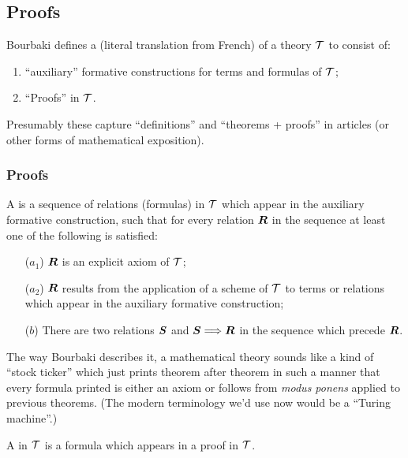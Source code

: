 \subsection{Proofs}

\begin{definition}
Bourbaki defines a  (literal translation from
French) of a theory $\mathcal{T}$ to consist of:
\begin{enumerate}
\item ``auxiliary'' formative constructions for terms and formulas of
  $\mathcal{T}$; 
\item ``Proofs'' in $\mathcal{T}$.
\end{enumerate}
Presumably these capture ``definitions'' and ``theorems + proofs''
in articles (or other forms of mathematical exposition).
\end{definition}

\subsubsection{Proofs}\label{subsec:2-2:proofs} A  is a sequence of
relations (formulas) in $\mathcal{T}$ which appear in the auxiliary
formative construction, such that for every relation $\boldsymbol{R}$
in the sequence at least one of the following is satisfied:
\begin{itemize}
\item[($a_{1}$)] $\boldsymbol{R}$ is an explicit axiom of $\mathcal{T}$;
\item[($a_{2}$)] $\boldsymbol{R}$ results from the application of a
  scheme of $\mathcal{T}$ to terms or relations which appear in the
  auxiliary formative construction;
\item[($b$)] There are two relations $\boldsymbol{S}$ and
  $\boldsymbol{S}\Longrightarrow\boldsymbol{R}$ in the sequence which
  precede $\boldsymbol{R}$. 
\end{itemize}
The way Bourbaki describes it, a mathematical theory sounds like a kind
of ``stock ticker'' which just prints theorem after theorem in such a
manner that every formula printed is either an axiom or follows from
\textit{modus ponens} applied to previous theorems. (The modern
terminology we'd use now would be a ``Turing machine''.)

\begin{definition}
A  in $\mathcal{T}$ is a formula which appears in a proof
in $\mathcal{T}$.
\end{definition}

